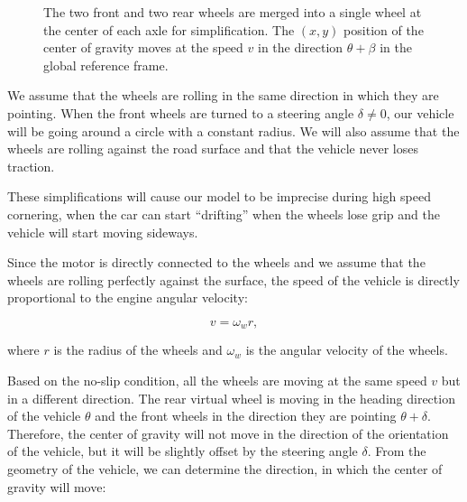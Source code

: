 \begin{figure}[h!]
	
	\caption{The two front and two rear wheels are merged into a single wheel at the center of each axle for simplification. The $(x,y)$ position of the center of gravity moves at the speed $v$ in the direction $\theta+\beta$ in the global reference frame.}
	\label{fig:kinematic_bicycle}
\end{figure}

We assume that the wheels are rolling in the same direction in which they are pointing. When the front wheels are turned to a steering angle $\delta\neq 0$, our vehicle will be going around a circle with a constant radius. We will also assume that the wheels are rolling against the road surface and that the vehicle never loses traction.

These simplifications will cause our model to be imprecise during high speed cornering, when the car can start ``drifting'' when the wheels lose grip and the vehicle will start moving sideways.

Since the motor is directly connected to the wheels and we assume that the wheels are rolling perfectly against the surface, the speed of the vehicle is directly proportional to the engine angular velocity:

\begin{equation*}
v=\omega_w r,
\end{equation*}

where $r$ is the radius of the wheels and $\omega_w$ is the angular velocity of the wheels.

Based on the no-slip condition, all the wheels are moving at the same speed $v$ but in a different direction. The rear virtual wheel is moving in the heading direction of the vehicle $\theta$ and the front wheels in the direction they are pointing $\theta + \delta$. Therefore, the center of gravity will not move in the direction of the orientation of the vehicle, but it will be slightly offset by the steering angle $\delta$. From the geometry of the vehicle, we can determine the direction, in which the center of gravity will move:

